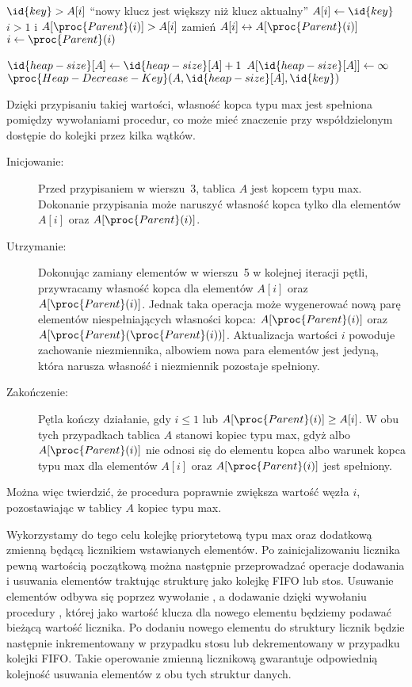 \begin{codebox}
\li	\If $\id{key}>A[i]$
\li		\Then
			\Error ``nowy klucz jest większy niż klucz aktualny''
		\End
\li	$A[i]\gets\id{key}$
\li	\While $i>1$ i $A[\proc{Parent}(i)]>A[i]$
\li		\Do
			zamień $A[i]\leftrightarrow A[\proc{Parent}(i)]$
\li			$i\gets\proc{Parent}(i)$
		\End
\end{codebox}

\begin{codebox}
\li	$\id{heap-size}[A]\gets\id{heap-size}[A]+1$
\li	$A[\id{heap-size}[A]]\gets\infty$
\li	$\proc{Heap-Decrease-Key}(A,\id{heap-size}[A],\id{key})$
\end{codebox}

\exercise %
Dzięki przypisaniu takiej wartości, własność kopca typu max jest spełniona pomiędzy wywołaniami procedur, co może mieć znaczenie przy współdzielonym dostępie do kolejki przez kilka wątków.

\exercise %
\begin{description}
	\item[Inicjowanie:] Przed przypisaniem w wierszu~3, tablica $A$ jest kopcem typu max. Dokonanie przypisania może naruszyć własność kopca tylko dla elementów $A[i]$ oraz $A[\proc{Parent}(i)]$.
	\item[Utrzymanie:] Dokonując zamiany elementów w wierszu~5 w kolejnej iteracji pętli, przywracamy własność kopca dla elementów $A[i]$ oraz $A[\proc{Parent}(i)]$. Jednak taka operacja może wygenerować nową parę elementów niespełniających własności kopca: $A[\proc{Parent}(i)]$ oraz $A[\proc{Parent}(\proc{Parent}(i))]$. Aktualizacja wartości $i$ powoduje zachowanie niezmiennika, albowiem nowa para elementów jest jedyną, która narusza własność i niezmiennik pozostaje spełniony.
	\item[Zakończenie:] Pętla kończy działanie, gdy $i\le1$ lub $A[\proc{Parent}(i)]\ge A[i]$. W obu tych przypadkach tablica $A$ stanowi kopiec typu max, gdyż albo $A[\proc{Parent}(i)]$ nie odnosi się do elementu kopca albo warunek kopca typu max dla elementów $A[i]$ oraz $A[\proc{Parent}(i)]$ jest spełniony.
\end{description}
Można więc twierdzić, że procedura  poprawnie zwiększa wartość węzła $i$, pozostawiając w tablicy $A$ kopiec typu max.

\exercise %
Wykorzystamy do tego celu kolejkę priorytetową typu max oraz dodatkową zmienną będącą licznikiem wstawianych elementów. Po zainicjalizowaniu licznika pewną wartością początkową można następnie przeprowadzać operacje dodawania i usuwania elementów traktując strukturę jako kolejkę FIFO lub stos. Usuwanie elementów odbywa się poprzez wywołanie , a dodawanie dzięki wywołaniu procedury , której jako wartość klucza dla nowego elementu będziemy podawać bieżącą wartość licznika. Po dodaniu nowego elementu do struktury licznik będzie następnie inkrementowany w przypadku stosu lub dekrementowany w przypadku kolejki FIFO. Takie operowanie zmienną licznikową gwarantuje odpowiednią kolejność usuwania elementów z obu tych struktur danych.

